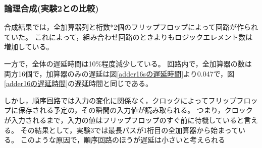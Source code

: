 \subsubsection{論理合成(実験2との比較)}
合成結果では，全加算器列と桁数*2個のフリップフロップによって回路が作られていた。
これによって，組み合わせ回路のときよりもロジックエレメント数は増加している。

一方で，全体の遅延時間は10\%程度減少している。
回路内で，全加算器の数は両方16個で，加算器のみの遅延は図\ref{adder16sの遅延時間}より0.047で，図\ref{adder16の遅延時間}の遅延時間と同じである。

しかし，順序回路では入力の変化に関係なく，クロックによってフリップフロップに保存される予定の，その瞬間の入力値が読み取られる。
つまり，クロックが入力されるまで，入力の値はフリップフロップのすぐ前に待機していると言える。
その結果として，実験3では最長パスが1桁目の全加算器から始まっている。
このような原因で，順序回路のほうが遅延は小さいと考えられる\\
